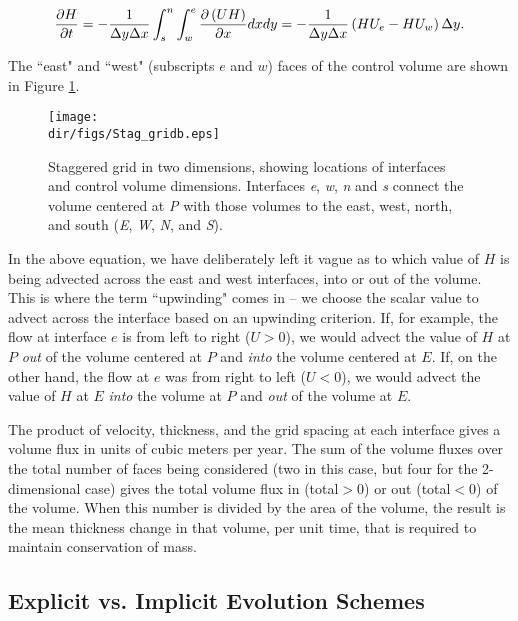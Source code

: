 \begin{equation}
\frac{\partial H}{\partial t}=-\frac{1}{\Delta y\Delta x}\int_{s}^{n}{\int_{w}^{e}{\frac{\partial \left( UH \right)}{\partial x}}}dxdy=-\frac{1}{\Delta y\Delta x}\left( HU_{e}-HU_{w} \right)\Delta y. \\
\end{equation}

The ``east" and ``west" (subscripts $e$ and $w$) faces of the control volume are shown in Figure \ref{fig:stag_c_grid2}.

\begin{figure}
  \begin{center}
    \texttt{[image: \\dir/figs/Stag\_gridb.eps]}
  \end{center}
  \caption{Staggered grid in two dimensions, showing locations of interfaces and control volume dimensions. Interfaces \textit{e}, \textit{w}, \textit{n} and \textit{s} connect the volume centered at \textit{P} with those volumes to the east, west, north, and south (\textit{E}, \textit{W}, \textit{N}, and \textit{S}).}
  \label{fig:stag_c_grid2}
\end{figure} 

In the above equation, we have deliberately left it vague as to which value of $H$ is being advected across the east and west interfaces, into or out of the volume. This is where the term ``upwinding" comes in -- we choose the scalar value to advect across the interface based on an upwinding criterion. If, for example, the flow at interface $e$ is from left to right ($U>0$), we would advect the value of $H$ at $P$ \textit{out} of the volume centered at $P$ and \textit{into} the volume centered at $E$. If, on the other hand, the flow at $e$ was from right to left ($U<0$), we would advect the value of $H$ at $E$ \textit{into} the volume at $P$ and \textit{out} of the volume at $E$. 

The product of velocity, thickness, and the grid spacing at each interface gives a volume flux in units of cubic meters per year. The sum of the volume fluxes over the total number of faces being considered (two in this case, but four for the 2-dimensional case) gives the total volume flux in (total$>$0) or out (total$<$0) of the volume. When this number is divided by the area of the volume, the result is the mean thickness change in that volume, per unit time, that is required to maintain conservation of mass.

\subsection{Explicit vs. Implicit Evolution Schemes}

